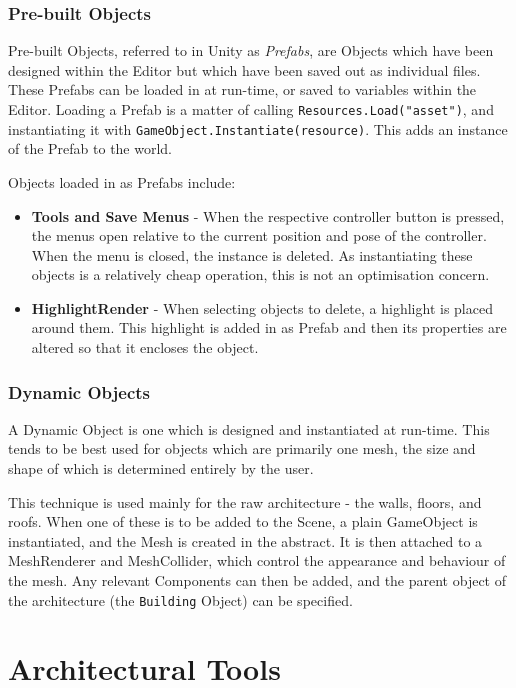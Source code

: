 \subsubsection*{Pre-built Objects}
Pre-built Objects, referred to in Unity as \textit{Prefabs}, are Objects which have been designed within the Editor but which have been saved out as individual files. These Prefabs can be loaded in at run-time, or saved to variables within the Editor. Loading a Prefab is a matter of calling \verb|Resources.Load("asset")|, and instantiating it with \verb|GameObject.Instantiate(resource)|. This adds an instance of the Prefab to the world.

Objects loaded in as Prefabs include:

\begin{itemize}
    \item \textbf{Tools and Save Menus} - When the respective controller button is pressed, the menus open relative to the current position and pose of the controller. When the menu is closed, the instance is deleted. As instantiating these objects is a relatively cheap operation, this is not an optimisation concern.
    \item \textbf{HighlightRender} - When selecting objects to delete, a highlight is placed around them. This highlight is added in as Prefab and then its properties are altered so that it encloses the object.
\end{itemize}

\subsubsection*{Dynamic Objects}

A Dynamic Object is one which is designed and instantiated at run-time. This tends to be best used for objects which are primarily one mesh, the size and shape of which is determined entirely by the user.

This technique is used mainly for the raw architecture - the walls, floors, and roofs. When one of these is to be added to the Scene, a plain GameObject is instantiated, and the Mesh is created in the abstract. It is then attached to a MeshRenderer and MeshCollider, which control the appearance and behaviour of the mesh. Any relevant Components can then be added, and the parent object of the architecture (the \verb|Building| Object) can be specified.

\section{Architectural Tools}
\label{sec:tools}

